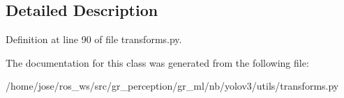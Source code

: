 \subsection{Detailed Description}


Definition at line 90 of file transforms.\+py.



The documentation for this class was generated from the following file\+:\begin{DoxyCompactItemize}
\item 
/home/jose/ros\+\_\+ws/src/gr\+\_\+perception/gr\+\_\+ml/nb/yolov3/utils/transforms.\+py\end{DoxyCompactItemize}
